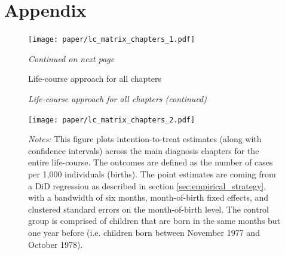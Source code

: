 \documentclass[11pt, a4paper]{article} %
\begin{document}
\newpage
\section{Appendix}



\begin{figure}[H]\centering
	\caption{Life-course approach for all chapters}\label{fig: appendix_lc_matrix_chapters}
	\texttt{[image: paper/lc\_matrix\_chapters\_1.pdf]}
		\scriptsize
		\begin{minipage}{\linewidth}
			\emph{Continued on next page}
		\end{minipage}
\end{figure}

\begin{figure}[H]\centering
		\begin{minipage}{\linewidth}\scriptsize
		\begin{center} \emph{Life-course approach for all chapters (continued)}\end{center}
	\end{minipage}
	\texttt{[image: paper/lc\_matrix\_chapters\_2.pdf]}
		\begin{minipage}{\linewidth}
		\scriptsize \emph{Notes:} This figure plots intention-to-treat estimates (along with confidence intervals) across the main diagnosis chapters for the entire life-course. The outcomes are defined as the number of cases per 1,000 individuals (births). The point estimates are coming from a DiD regression as described in section \ref{sec:empirical_strategy}, with a bandwidth of six months, month-of-birth fixed effects, and clustered standard errors on the month-of-birth level. The control group is comprised of children that are born in the same months but one year before (i.e. children born between November 1977 and October 1978).
	\end{minipage}
\end{figure}









\newpage
\end{document}
